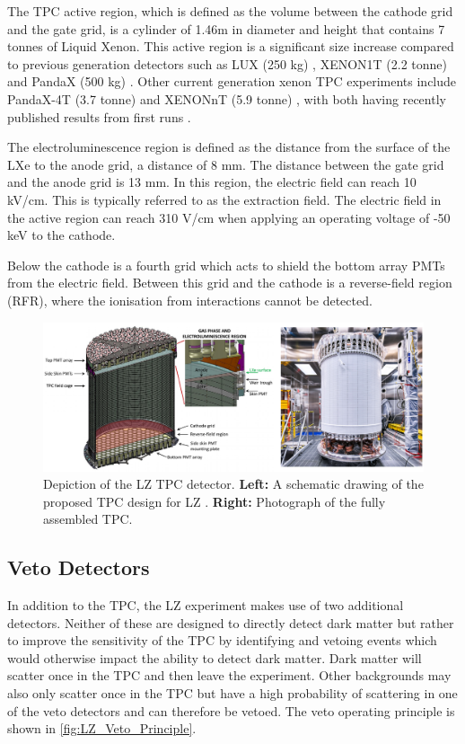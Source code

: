 \par
The TPC active region, which is defined as the volume between the cathode grid and the gate grid, is a cylinder of 1.46m in diameter and height that contains 7 tonnes of Liquid Xenon.
This active region is a significant size increase compared to previous generation detectors such as LUX (250 kg) \cite{lux_ref}, XENON1T (2.2 tonne) \cite{xenon1t_ref} and PandaX (500 kg) \cite{pandax_ref}.
Other current generation xenon TPC experiments include PandaX-4T (3.7 tonne) \cite{pandax_4t_ref} and XENONnT (5.9 tonne) \cite{xenonnt_projected_sensitivty_ref}, with both having recently published results from first runs \cite{pandax_4t_sr1_ref,xenonnt_sr1_er_ref}. 
\par
The electroluminescence region is defined as the distance from the surface of the LXe to the anode grid, a distance of 8 mm.
The distance between the gate grid and the anode grid is 13 mm.
In this region, the electric field can reach 10 kV/cm.
This is typically referred to as the extraction field.
The electric field in the active region can reach 310 V/cm when applying an operating voltage of -50 keV to the cathode.
\par
Below the cathode is a fourth grid which acts to shield the bottom array PMTs from the electric field.
Between this grid and the cathode is a reverse-field region (RFR), where the ionisation from interactions cannot be detected.


\begin{figure}
\includegraphics[width=\columnwidth]{Figures/LZ/lz_tpc_schematic.png}%
\caption{Depiction of the LZ TPC detector.
         \textbf{Left:} A schematic drawing of the proposed TPC design for LZ \cite{LZ_TechnicalDesignReview_ref}.
         \textbf{Right:} Photograph of the fully assembled TPC.
}
\label{fig:lz_tpc_schematic}
\end{figure}


\subsection{Veto Detectors}
\label{sec:lz_veto_detectors}
\par
In addition to the TPC, the LZ experiment makes use of two additional detectors.
Neither of these are designed to directly detect dark matter but rather to improve the sensitivity of the TPC by identifying and vetoing events which would otherwise impact the ability to detect dark matter.
Dark matter will scatter once in the TPC and then leave the experiment.
Other backgrounds may also only scatter once in the TPC but have a high probability of scattering in one of the veto detectors and can therefore be vetoed.
The veto operating principle is shown in \autoref{fig:LZ_Veto_Principle}.

